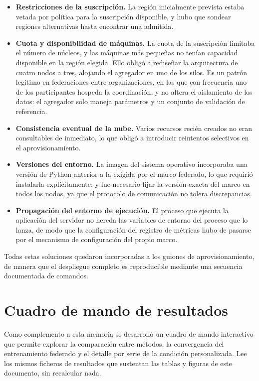 \begin{itemize}
  \item \textbf{Restricciones de la suscripción.} La región inicialmente prevista estaba vetada por
    política para la suscripción disponible, y hubo que sondear regiones alternativas hasta
    encontrar una admitida.

  \item \textbf{Cuota y disponibilidad de máquinas.} La cuota de la suscripción limitaba el número
    de núcleos, y las máquinas más pequeñas no tenían capacidad disponible en la región elegida.
    Ello obligó a rediseñar la arquitectura de cuatro nodos a tres, alojando el agregador en uno de
    los silos. Es un patrón legítimo en federaciones entre organizaciones, en las que con frecuencia
    uno de los participantes hospeda la coordinación, y no altera el aislamiento de los datos: el
    agregador solo maneja parámetros y un conjunto de validación de referencia.

  \item \textbf{Consistencia eventual de la nube.} Varios recursos recién creados no eran
    consultables de inmediato, lo que obligó a introducir reintentos selectivos en el
    aprovisionamiento.

  \item \textbf{Versiones del entorno.} La imagen del sistema operativo incorporaba una versión de
    Python anterior a la exigida por el marco federado, lo que requirió instalarla explícitamente;
    y fue necesario fijar la versión exacta del marco en todos los nodos, ya que el protocolo de
    comunicación no tolera discrepancias.

  \item \textbf{Propagación del entorno de ejecución.} El proceso que ejecuta la aplicación del
    servidor no hereda las variables de entorno del proceso que lo lanza, de modo que la
    configuración del registro de métricas hubo de pasarse por el mecanismo de configuración del
    propio marco.
\end{itemize}

Todas estas soluciones quedaron incorporadas a los guiones de aprovisionamiento, de manera que el
despliegue completo es reproducible mediante una secuencia documentada de comandos.

\section{Cuadro de mando de resultados}

Como complemento a esta memoria se desarrolló un cuadro de mando interactivo que permite explorar la
comparación entre métodos, la convergencia del entrenamiento federado y el detalle por serie de la
condición personalizada. Lee los mismos ficheros de resultados que sustentan las tablas y figuras
de este documento, sin recalcular nada.
